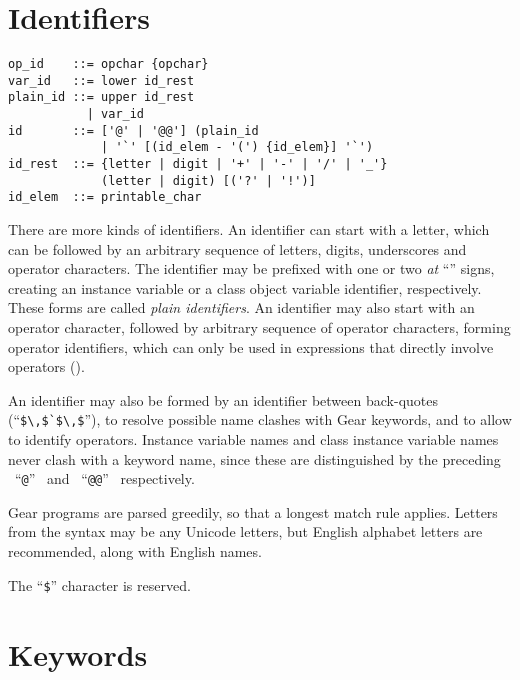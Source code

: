 \newpage






\section{Identifiers}
\label{sec:identifiers}

\syntax\begin{lstlisting}
op_id    ::= opchar {opchar}
var_id   ::= lower id_rest
plain_id ::= upper id_rest
           | var_id
id       ::= ['@' | '@@'] (plain_id
             | '`' [(id_elem - '(') {id_elem}] '`')
id_rest  ::= {letter | digit | '+' | '-' | '/' | '_'}
             (letter | digit) [('?' | '!')]
id_elem  ::= printable_char
\end{lstlisting}

There are more kinds of identifiers. An identifier can start with a letter, which can be followed by an arbitrary sequence of letters, digits, underscores and operator characters. The identifier may be prefixed with one or two {\em at} ``'' signs, creating an instance variable or a class object variable identifier, respectively. These forms are called {\em plain identifiers}. An identifier may also start with an operator character, followed by arbitrary sequence of operator characters, forming operator identifiers, which can only be used in expressions that directly involve operators (). 

An identifier may also be formed by an identifier between back-quotes (``\lstinline!$\,$`$\,$!''), to resolve possible name clashes with Gear keywords, and to allow to identify operators. Instance variable names and class instance variable names never clash with a keyword name, since these are distinguished by the preceding ~``\lstinline!@!''~ and ~``\lstinline!@@!''~ respectively. 

Gear programs are parsed greedily, so that a longest match rule applies. Letters from the syntax may be any Unicode letters, but English alphabet letters are recommended, along with English names.

The ``\lstinline[mathescape=false]!$!'' character is reserved. 






\section{Keywords}\label{sec:keywords}

